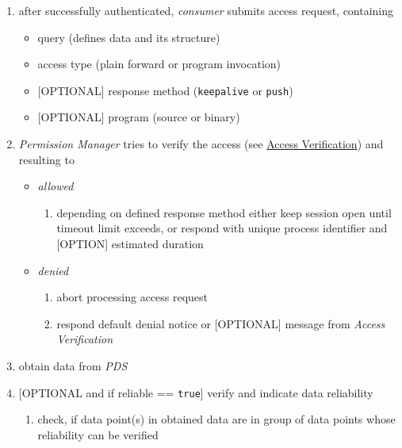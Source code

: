 \documentclass[12pt,english,a4paper,titlepage,cleardoublepage=empty,dottedtoc]{report}
\providecommand{\tightlist}{%
  \setlength{\itemsep}{0pt}\setlength{\parskip}{0pt}}
\begin{document}
\begin{enumerate}
\def\labelenumi{\arabic{enumi}.}
\item
  after successfully authenticated, \emph{consumer} submits access
  request, containing

  \begin{itemize}
  \tightlist
  \item
    query (defines data and its structure)
  \item
    access type (plain forward or program invocation)
  \item
    {[}OPTIONAL{]} response method (\texttt{keepalive} or \texttt{push})
  \item
    {[}OPTIONAL{]} program (source or binary)
  \end{itemize}
\item
  \emph{Permission Manager} tries to verify the access (see
  \protect\hyperlink{access-verification}{Access Verification}) and
  resulting to

  \begin{itemize}
  \tightlist
  \item
    \emph{allowed}

    \begin{enumerate}
    \def\labelenumii{\arabic{enumii})}
    \tightlist
    \item
      depending on defined response method either keep session open
      until timeout limit exceeds, or respond with unique process
      identifier and {[}OPTION{]} estimated duration
    \end{enumerate}
  \item
    \emph{denied}

    \begin{enumerate}
    \def\labelenumii{\arabic{enumii})}
    \tightlist
    \item
      abort processing access request
    \item
      respond default denial notice or {[}OPTIONAL{]} message from
      \emph{Access Verification}
    \end{enumerate}
  \end{itemize}
\item
  obtain data from \emph{PDS}
\item
  {[}OPTIONAL and if reliable == \texttt{true}{]} verify and indicate
  data reliability

  \begin{enumerate}
  \def\labelenumii{\arabic{enumii})}
  \tightlist
  \item
    check, if data point(s) in obtained data are in group of data points
    whose reliability can be verified


\end{enumerate}
\end{enumerate}
\end{document}
